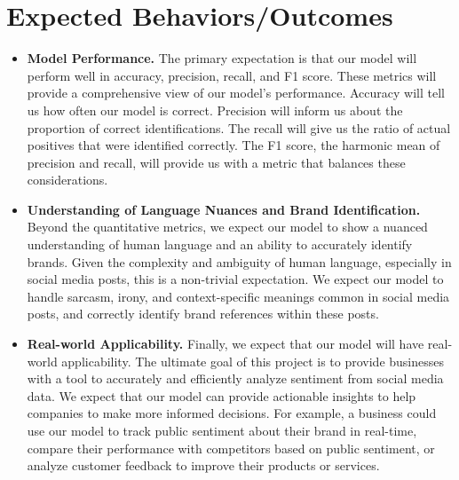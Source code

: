 \documentclass{article}
\begin{document}
\section{Expected Behaviors/Outcomes}

\begin{itemize}
    \item \textbf{Model Performance.} The primary expectation is that our model
          will perform well in accuracy, precision, recall, and F1 score. These metrics
          will provide a comprehensive view of our model's performance. Accuracy will
          tell us how often our model is correct. Precision will inform us about the
          proportion of correct identifications. The recall will give us the ratio of
          actual positives that were identified correctly. The F1 score, the harmonic
          mean of precision and recall, will provide us with a metric that balances these
          considerations.

    \item \textbf{Understanding of Language Nuances and Brand Identification.}
          Beyond the quantitative metrics, we expect our model to show a nuanced
          understanding of human language and an ability to accurately identify brands.
          Given the complexity and ambiguity of human language, especially in social
          media posts, this is a non-trivial expectation. We expect our model to handle
          sarcasm, irony, and context-specific meanings common in social media posts, and
          correctly identify brand references within these posts.

    \item \textbf{Real-world Applicability.} Finally, we expect that our model
          will have real-world applicability. The ultimate goal of this project is to
          provide businesses with a tool to accurately and efficiently analyze sentiment
          from social media data. We expect that our model can provide actionable
          insights to help companies to make more informed decisions. For example, a
          business could use our model to track public sentiment about their brand in
          real-time, compare their performance with competitors based on public
          sentiment, or analyze customer feedback to improve their products or services.
\end{itemize}
\end{document}
